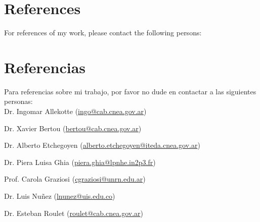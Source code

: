 \ifeng
\section*{References}

For references of my work, please contact the following persons:\\
\else
\section*{Referencias}

Para referencias sobre mi trabajo, por favor no dude en contactar a las siguientes personas:\\

\fi
Dr. Ingomar Allekotte (\href{mailto:ingo@cab.cnea.gov.ar}{ingo@cab.cnea.gov.ar})

Dr. Xavier Bertou (\href{mailto:bertou@cab.cnea.gov.ar}{bertou@cab.cnea.gov.ar})

Dr. Alberto Etchegoyen (\href{mailto:alberto.etchegoyen@iteda.cnea.gov.ar}{alberto.etchegoyen@iteda.cnea.gov.ar})

Dr. Piera Luisa Ghia (\href{mailto:piera.ghia@lpnhe.in2p3.fr}{piera.ghia@lpnhe.in2p3.fr})

Prof. Carola Graziosi (\href{mailto:cgraziosi@unrn.edu.ar}{cgraziosi@unrn.edu.ar})

Dr. Luis Nuñez (\href{mailto:lnunez@uis.edu.co}{lnunez@uis.edu.co})

Dr. Esteban Roulet (\href{mailto:roulet@cab.cnea.gov.ar}{roulet@cab.cnea.gov.ar})
